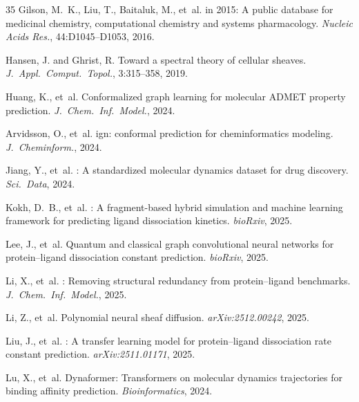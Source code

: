 \documentclass{article}
\begin{document}
\begin{thebibliography}{35}
Gilson, M.~K., Liu, T., Baitaluk, M., et~al.
 in 2015: A public database for medicinal chemistry, computational chemistry and systems pharmacology.
\newblock \emph{Nucleic Acids Res.}, 44:D1045--D1053, 2016.

Hansen, J. and Ghrist, R.
\newblock Toward a spectral theory of cellular sheaves.
\newblock \emph{J.\ Appl.\ Comput.\ Topol.}, 3:315--358, 2019.

Huang, K., et~al.
\newblock Conformalized graph learning for molecular {ADMET} property prediction.
\newblock \emph{J.\ Chem.\ Inf.\ Model.}, 2024.

Arvidsson, O., et~al.
ign: conformal prediction for cheminformatics modeling.
\newblock \emph{J.\ Cheminform.}, 2024.

Jiang, Y., et~al.
: A standardized molecular dynamics dataset for drug discovery.
\newblock \emph{Sci.\ Data}, 2024.

Kokh, D.~B., et~al.
: A fragment-based hybrid simulation and machine learning framework for predicting ligand dissociation kinetics.
\newblock \emph{bioRxiv}, 2025.

Lee, J., et~al.
\newblock Quantum and classical graph convolutional neural networks for protein--ligand dissociation constant prediction.
\newblock \emph{bioRxiv}, 2025.

Li, X., et~al.
: Removing structural redundancy from protein--ligand benchmarks.
\newblock \emph{J.\ Chem.\ Inf.\ Model.}, 2025.

Li, Z., et~al.
\newblock Polynomial neural sheaf diffusion.
\newblock \emph{arXiv:2512.00242}, 2025.

Liu, J., et~al.
: A transfer learning model for protein--ligand dissociation rate constant prediction.
\newblock \emph{arXiv:2511.01171}, 2025.

Lu, X., et~al.
\newblock Dynaformer: {T}ransformers on molecular dynamics trajectories for binding affinity prediction.
\newblock \emph{Bioinformatics}, 2024.


\end{thebibliography}
\end{document}
